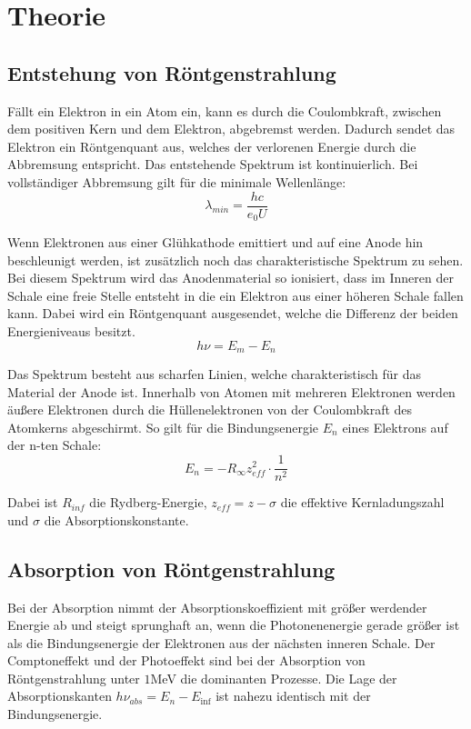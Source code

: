 \section{Theorie}
\label{sec:Theorie}

\subsection{Entstehung von Röntgenstrahlung}

Fällt ein Elektron in ein Atom ein, kann es durch die Coulombkraft, zwischen dem positiven Kern
und dem Elektron, abgebremst werden. Dadurch sendet das Elektron ein Röntgenquant  aus, welches der
verlorenen Energie durch die Abbremsung entspricht. Das entstehende Spektrum ist kontinuierlich.
Bei vollständiger Abbremsung gilt für die minimale Wellenlänge:
\begin{equation}
  \lambda_{min} = \frac{h c}{e_0 U}
\end{equation}

Wenn Elektronen aus einer Glühkathode emittiert und auf eine Anode hin beschleunigt werden, ist zusätzlich
noch das charakteristische Spektrum zu sehen. Bei diesem Spektrum wird das Anodenmaterial so ionisiert, dass im Inneren
der Schale eine freie Stelle entsteht in die ein Elektron aus einer höheren Schale fallen kann. Dabei wird
ein Röntgenquant ausgesendet, welche die Differenz der beiden Energieniveaus besitzt.
\begin{equation}
  h \nu = E_m - E_n
\end{equation}

Das Spektrum besteht aus scharfen Linien, welche charakteristisch für das Material der Anode ist.
Innerhalb von Atomen mit mehreren Elektronen werden äußere Elektronen durch die Hüllenelektronen von
der Coulombkraft des Atomkerns abgeschirmt.
So gilt für die Bindungsenergie $E_n$ eines Elektrons auf der n-ten Schale:
\begin{equation}
  E_n = -R_{\infty} z_{eff}^2 \cdot \frac{1}{n^2}
\end{equation}

Dabei ist $R_{inf}$ die Rydberg-Energie, $z_{eff} = z - \sigma$ die effektive Kernladungszahl und $\sigma$ die Absorptionskonstante.

\subsection{Absorption von Röntgenstrahlung}
Bei der Absorption nimmt der Absorptionskoeffizient mit größer werdender Energie ab und steigt sprunghaft an, wenn
die Photonenenergie gerade größer ist als die Bindungsenergie der Elektronen aus der nächsten inneren Schale. Der
Comptoneffekt und der Photoeffekt sind bei der Absorption von Röntgenstrahlung unter $1$MeV die dominanten Prozesse.
Die Lage der Absorptionskanten $h \nu_{abs} = E_n - E_{\inf}$ ist nahezu identisch mit der Bindungsenergie.

